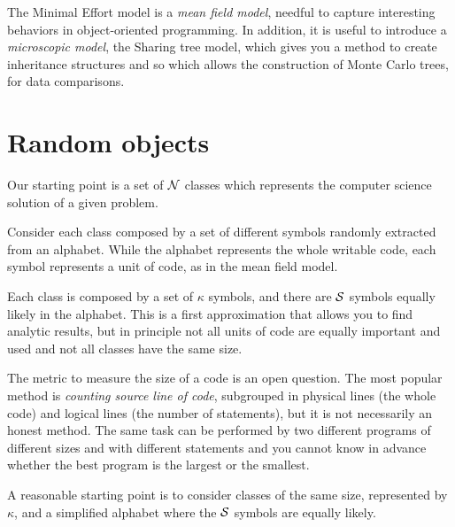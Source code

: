 The Minimal Effort model is a \textit{mean field model}, needful to capture interesting behaviors in object-oriented programming. In addition, it is useful to introduce a \textit{microscopic model}, the Sharing tree model, which gives you a method to create inheritance structures and so which allows the construction of Monte Carlo trees, for data comparisons.

\section{Random objects}
Our starting point is a set of $\mathcal N$ classes which represents the computer science solution of a given problem. 

Consider each class composed by a set of different symbols randomly extracted from an alphabet. While the alphabet represents the whole writable code, each symbol represents a unit of code, as in the mean field model.

Each class is composed by a set of $\kappa$ symbols, and there are $\mathcal S$ symbols equally likely in the alphabet. This is a first approximation that allows you to find analytic results, but in principle not all units of code are equally important and used and not all classes have the same size.

The metric to measure the size of a code is an open question. The most popular method is \textit{counting source line of code}, subgrouped in physical lines (the whole code) and logical lines (the number of statements), but it is not necessarily an honest method. The same task can be performed by two different programs of different sizes and with different statements and you cannot know in advance whether the best program is the largest or the smallest.

A reasonable starting point is to consider classes of the same size, represented by $\kappa$, and a simplified alphabet where the $\mathcal S$ symbols are equally likely.


